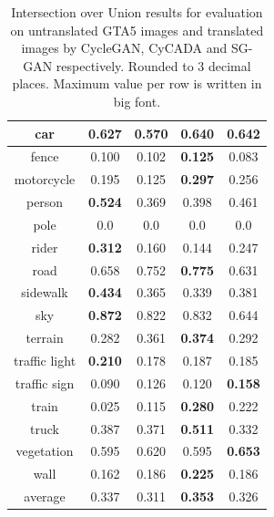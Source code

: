 \begin{table}
\begin{tabular}{|c|c|c|c|c|}
		\hline 
		car & 0.627 & 0.570 & 0.640 & \textbf{0.642}\\ 
		\hline 
		fence & 0.100 & 0.102 & \textbf{0.125} & 0.083\\ 
		\hline 
		motorcycle & 0.195 & 0.125 & \textbf{0.297} & 0.256\\ 
		\hline 
		person & \textbf{0.524} & 0.369 & 0.398 & 0.461\\ 
		\hline 
		pole & 0.0 & 0.0 & 0.0 & 0.0\\ 
		\hline 
		rider & \textbf{0.312} & 0.160 & 0.144 & 0.247\\ 
		\hline 
		road & 0.658 & 0.752 & \textbf{0.775} & 0.631\\ 
		\hline 
		sidewalk & \textbf{0.434} & 0.365 & 0.339 & 0.381\\ 
		\hline 
		sky & \textbf{0.872} & 0.822 & 0.832 & 0.644\\ 
		\hline 
		terrain & 0.282 & 0.361 & \textbf{0.374} & 0.292\\ 
		\hline 
		traffic light & \textbf{0.210} & 0.178 & 0.187 & 0.185\\ 
		\hline 
		traffic sign & 0.090 & 0.126 & 0.120 & \textbf{0.158}\\ 
		\hline 
		train & 0.025 & 0.115 & \textbf{0.280} & 0.222\\ 
		\hline 
		truck & 0.387 & 0.371 & \textbf{0.511} & 0.332\\ 
		\hline 
		vegetation & 0.595 & 0.620 & 0.595 & \textbf{0.653}\\ 
		\hline 
		wall & 0.162 & 0.186 & \textbf{0.225} & 0.186\\ 
		\hline \hline 
		average & 0.337 & 0.311 & \textbf{0.353} & 0.326\\
		\hline
	\end{tabular} 
	\caption{Intersection over Union results for evaluation on untranslated GTA5 images and translated images by CycleGAN, CyCADA and SG-GAN respectively. Rounded to 3 decimal places. Maximum value per row is written in big font.}
	\label{table:results_quant}
\end{table}

